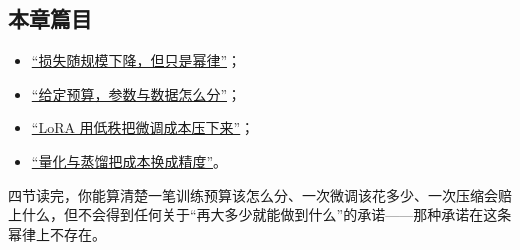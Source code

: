 \subsection{本章篇目}

\begin{itemize}
\tightlist
\item \hyperref[sec:14-Deep-Learning/09-Scaling-and-Adaptation/01]{``损失随规模下降，但只是幂律''}；
\item \hyperref[sec:14-Deep-Learning/09-Scaling-and-Adaptation/02]{``给定预算，参数与数据怎么分''}；
\item \hyperref[sec:14-Deep-Learning/09-Scaling-and-Adaptation/03]{``LoRA 用低秩把微调成本压下来''}；
\item \hyperref[sec:14-Deep-Learning/09-Scaling-and-Adaptation/04]{``量化与蒸馏把成本换成精度''}。
\end{itemize}

四节读完，你能算清楚一笔训练预算该怎么分、一次微调该花多少、一次压缩会赔上什么，但不会得到任何关于``再大多少就能做到什么''的承诺——那种承诺在这条幂律上不存在。
